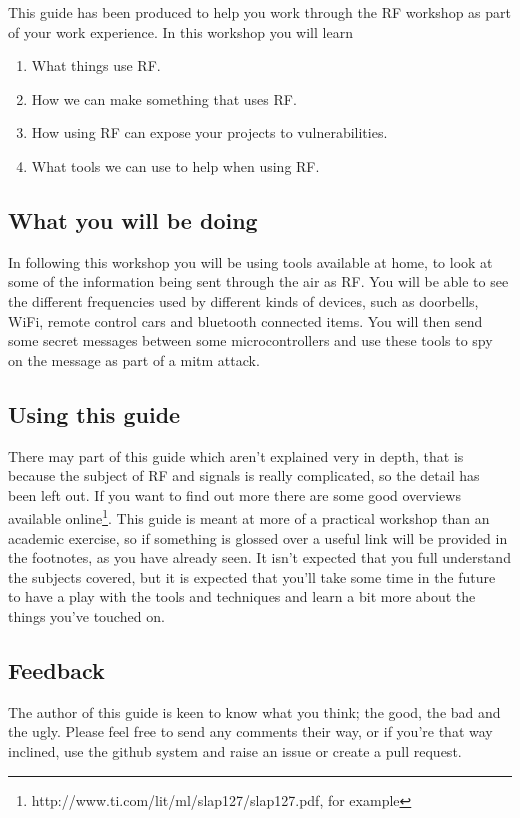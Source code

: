 This guide has been produced to help you work through the \gls{RF} workshop as part of your work experience. In this workshop you will learn \begin{enumerate}\item What things use \gls{RF}. \item How we can make something that uses \gls{RF}. \item How using \gls{RF} can expose your projects to vulnerabilities. \item What tools we can use to help when using \gls{RF}.\end{enumerate}

\subsection{What you will be doing}
In following this workshop you will be using tools available at home, to look at some of the information being sent through the air as \gls{RF}. You will be able to see the different frequencies used by different kinds of devices, such as doorbells, WiFi, remote control cars and bluetooth connected items. You will then send some secret messages between some microcontrollers and use these tools to spy on the message as part of a \gls{mitm} attack.

\subsection{Using this guide}
There may part of this guide which aren't explained very in depth, that is because the subject of \gls{RF} and signals is really complicated, so the detail has been left out. If you want to find out more there are some good overviews available online\footnote{http://www.ti.com/lit/ml/slap127/slap127.pdf, for example}. This guide is meant at more of a practical workshop than an academic exercise, so if something is glossed over a useful link will be provided in the footnotes, as you have already seen. It isn't expected that you full understand the subjects covered, but it is expected that you'll take some time in the future to have a play with the tools and techniques and learn a bit more about the things you've touched on.



\subsection{Feedback}
The author of this guide is keen to know what you think; the good, the bad and the ugly. Please feel free to send any comments their way, or if you're that way inclined, use the github system and raise an issue or create a pull request. 
